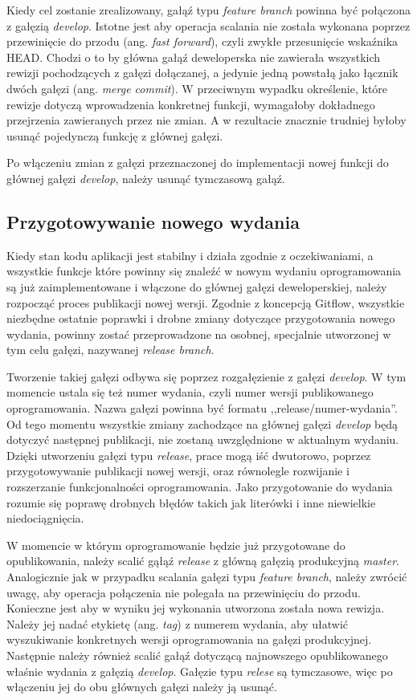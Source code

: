\documentclass[11pt,a4paper,polish,thesis]{dcsbook}
\begin{document}
	Kiedy cel zostanie zrealizowany, gałąź typu \textit{feature branch} powinna być połączona z gałęzią \textit{develop}. Istotne jest aby operacja scalania nie została wykonana poprzez przewinięcie do przodu (ang. \textit{fast forward}), czyli zwykłe przesunięcie wskaźnika HEAD. Chodzi o to by główna gałąź deweloperska nie zawierała wszystkich rewizji pochodzących z gałęzi dołączanej, a jedynie jedną powstałą jako łącznik dwóch gałęzi (ang. \textit{merge commit}). W przeciwnym wypadku określenie, które rewizje dotyczą wprowadzenia konkretnej funkcji, wymagałoby dokładnego przejrzenia zawieranych przez nie zmian. A w rezultacie znacznie trudniej byłoby usunąć pojedynczą funkcję z głównej gałęzi. 
	
	Po włączeniu zmian z gałęzi przeznaczonej do implementacji nowej funkcji do głównej gałęzi \textit{develop}, 
	należy usunąć tymczasową gałąź.
	
	\subsection{Przygotowywanie nowego wydania}
	
	Kiedy stan kodu aplikacji jest stabilny i działa zgodnie z oczekiwaniami, a wszystkie funkcje które powinny się znaleźć w nowym wydaniu oprogramowania są już zaimplementowane i włączone do głównej gałęzi deweloperskiej, należy rozpocząć proces publikacji nowej wersji. Zgodnie z koncepcją Gitflow, wszystkie niezbędne ostatnie poprawki i drobne zmiany dotyczące przygotowania nowego wydania, powinny zostać przeprowadzone na osobnej, specjalnie utworzonej w tym celu gałęzi, nazywanej \textit{release branch}.
	
	Tworzenie takiej gałęzi odbywa się poprzez rozgałęzienie z gałęzi \textit{develop}. W tym momencie ustala się też numer wydania, czyli numer wersji publikowanego oprogramowania. Nazwa gałęzi powinna być formatu ,,release/numer-wydania''.
	Od tego momentu wszystkie zmiany zachodzące na głównej gałęzi \textit{develop} będą dotyczyć następnej publikacji, nie zostaną uwzględnione w aktualnym wydaniu. Dzięki utworzeniu gałęzi typu \textit{release}, prace mogą iść dwutorowo,  poprzez przygotowywanie publikacji nowej wersji, oraz równolegle rozwijanie i rozszerzanie funkcjonalności oprogramowania. Jako przygotowanie do wydania rozumie się poprawę drobnych błędów takich jak literówki i inne niewielkie niedociągnięcia.
	
	W momencie w którym oprogramowanie będzie już przygotowane do opublikowania, należy scalić gąłąź \textit{release} z główną gałęzią produkcyjną \textit{master}. Analogicznie jak w przypadku scalania gałęzi typu \textit{feature branch}, należy  zwrócić uwagę, aby operacja połączenia nie polegała na przewinięciu do przodu. Konieczne jest aby w wyniku jej wykonania utworzona została nowa rewizja. Należy jej nadać etykietę (ang. \textit{tag}) z numerem wydania, aby ułatwić wyszukiwanie konkretnych wersji oprogramowania na gałęzi produkcyjnej. Następnie należy również scalić gałąź dotyczącą najnowszego opublikowanego właśnie wydania z gałęzią \textit{develop}. Gałęzie typu \textit{relese} są tymczasowe, więc po włączeniu jej do obu głównych gałęzi należy ją usunąć.
	
\end{document}
